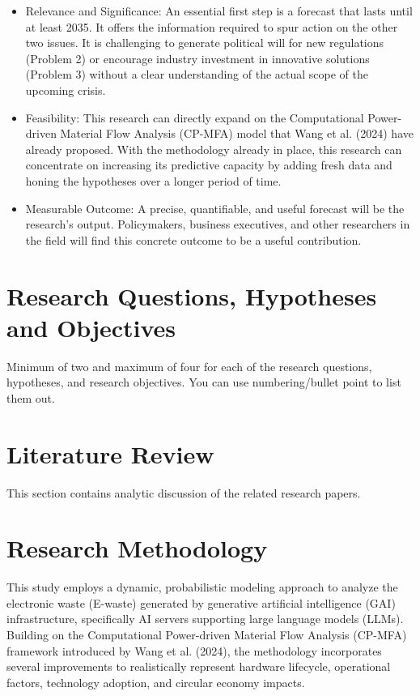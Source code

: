 \documentclass[a4paper, 12pt]{article}
\begin{document}
\begin{itemize}
	\item Relevance and Significance: An essential first step is a forecast that lasts until at least 2035. It offers the information required to spur action on the other two issues. It is challenging to generate political will for new regulations (Problem 2) or encourage industry investment in innovative solutions (Problem 3) without a clear understanding of the actual scope of the upcoming crisis.
	
	\item Feasibility: This research can directly expand on the Computational Power-driven Material Flow Analysis (CP-MFA) model that Wang et al. (2024) have already proposed. With the methodology already in place, this research can concentrate on increasing its predictive capacity by adding fresh data and honing the hypotheses over a longer period of time.
	
	\item Measurable Outcome: A precise, quantifiable, and useful forecast will be the research's output.  Policymakers, business executives, and other researchers in the field will find this concrete outcome to be a useful contribution.
\end{itemize}

\section{Research Questions, Hypotheses and Objectives}
Minimum of two and maximum of four for each of the research questions, hypotheses, and research objectives. You can use numbering/bullet point to list them out.

\section{Literature Review}
This section contains analytic discussion of the related research papers. 

\section{Research Methodology}
This study employs a dynamic, probabilistic modeling approach to analyze the electronic waste (E-waste) generated by generative artificial intelligence (GAI) infrastructure, specifically AI servers supporting large language models (LLMs). Building on the Computational Power-driven Material Flow Analysis (CP-MFA) framework introduced by Wang et al. (2024), the methodology incorporates several improvements to realistically represent hardware lifecycle, operational factors, technology adoption, and circular economy impacts.
\end{document}
